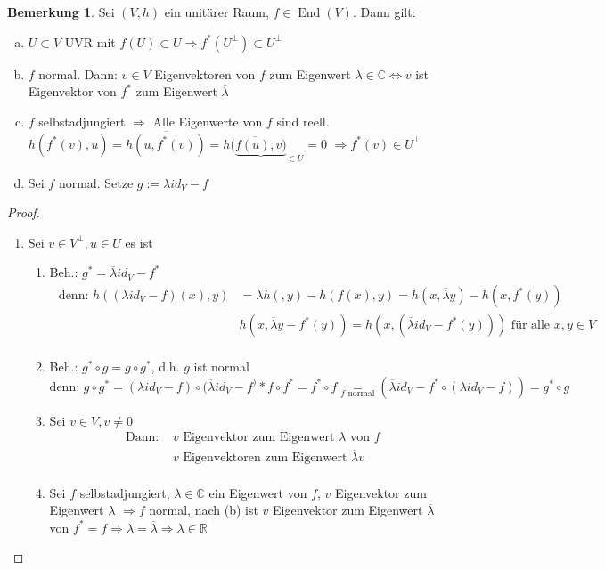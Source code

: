 \documentclass[a4paper, titlepage]{article}
\theoremstyle{definition}
\newtheorem{bem}[satz]{Bemerkung}
\newcommand{\R}{\mathbb{R}}
\newcommand{\C}{\mathbb{C}}
\begin{document}
\begin{bem}
	Sei  $(V,h)$ ein unitärer Raum, $f \in \operatorname{End}(V)$.
	Dann gilt:
	\begin{enumerate}[(a)]
		\item $U \subset V$ UVR mit $f(U) \subset U \Rightarrow f^{*}(U^{\bot}) \subset U^{\bot}$
		\item $f$ normal. Dann: $v \in V$ Eigenvektoren von $f$ zum Eigenwert $\lambda \in \C \Leftrightarrow v $ ist Eigenvektor von $f^{*}$ zum Eigenwert $\overline{\lambda}$
		\item $f$ selbstadjungiert $\Rightarrow$ Alle Eigenwerte von $f$ sind reell. $h(f^{*}(v),u) = \overline{h(u,f^{*}(v))}  = \overline{h(\underbrace{f(u),v)}}_{\in U} = 0 $
		$\Rightarrow f^{*}(v) \in U ^{\bot}$
		\item Sei $f$ normal. Setze $g := \lambda id_V - f$
	\end{enumerate}
\end{bem}
\begin{proof}
	\begin{enumerate}
		\item Sei $v\in V^{\bot}, u \in U$ es ist 
		\begin{enumerate}
			\item Beh.: $g^{*} = \overline{\lambda}id_V-f^{*}$
			\begin{align*}
				\text{ denn: } h((\lambda id_V-f)(x),y) 
				&= \lambda h(,y)-h(f(x),y) = h(x, \overline{\lambda}y)-h(x,f^{*}(y))\\
				&h(x,\overline{\lambda}y-f^{*}(y)) = h(x,(\overline{\lambda}id_V-f^{*}(y))) \text{ für alle } x,y \in V\\
			\end{align*}
				\item Beh.: $g^{*}\circ g=g\circ g^{*}$, d.h. $g$ ist normal 
				$
				\text{denn: } g \circ g^{*} = (\lambda id_V-f)\circ(\overline{\lambda}id_V-f^){*}f\circ f^{*} = f^{*}\circ f\underset{f \text{ normal}}{=}(\overline{\lambda}id_V-f^{*}\circ(\lambda id_V-f))= g^{*}\circ g$
				\item Sei $v\in V, v \neq 0$
		\begin{align*}
			\text{Dann: } 
			&v \text{ Eigenvektor zum Eigenwert } \lambda \text { von }f\\
			&v \text{ Eigenvektoren zum Eigenwert } \overline{\lambda}v\\
		\end{align*}
		
\item Sei $f$ selbstadjungiert, $\lambda \in \C$ ein Eigenwert von $f$, $v$ Eigenvektor zum Eigenwert $\lambda$ 
$\Rightarrow f$ normal, nach (b) ist $v$ Eigenvektor zum Eigenwert $\overline{\lambda}$ von $f^{*}=f \Rightarrow \lambda = \overline{\lambda}\Rightarrow \lambda \in \R$
\end{enumerate}
\end{enumerate}
\end{proof}
\end{document}
